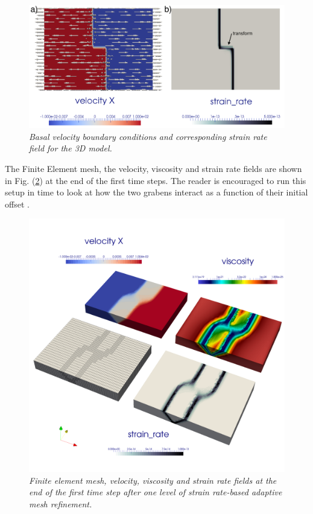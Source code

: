 \begin{figure}
  \centering
  \includegraphics[width=\textwidth]{cookbooks/crustal_deformation/doc/bottombc2.png}
  \caption{\it Basal velocity boundary conditions and corresponding
  strain rate field for the 3D model.}
  \label{fig:bottombc}
\end{figure}

The Finite Element mesh, the velocity, viscosity and strain rate fields are shown
in Fig. (\ref{fig:ext3D}) at the end of the first time steps. The reader is encouraged
to run this setup in time to look at how the two grabens interact as a function
of their initial offset \cite{alht11,alht12,alhf13}.

\begin{figure}
\centering
\includegraphics[width=\textwidth]{cookbooks/crustal_deformation/doc/all3D.png}
\caption{\it Finite element mesh, velocity, viscosity and strain rate fields at
the end of the first time step after one level of strain rate-based adaptive mesh refinement.}
\label{fig:ext3D}
\end{figure}
